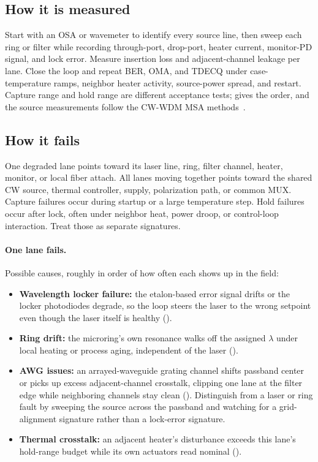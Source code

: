 \subsection{How it is measured}
\label{sec:wdm-how-measured}

Start with an OSA or wavemeter to identify every source line, then sweep each ring
or filter while recording through-port, drop-port, heater current, monitor-PD
signal, and lock error. Measure insertion loss and adjacent-channel leakage per
lane. Close the loop and repeat BER, OMA, and TDECQ under case-temperature ramps,
neighbor heater activity, source-power spread, and restart. Capture range and hold
range are different acceptance tests;  gives the order,
and the source measurements follow the CW-WDM MSA methods~\cite{cwwdm}.

\subsection{How it fails}
\label{sec:wdm-how-fails}

One degraded lane points toward its laser line, ring, filter channel, heater,
monitor, or local fiber attach. All lanes moving together points toward the shared
CW source, thermal controller, supply, polarization path, or common MUX. Capture
failures occur during startup or a large temperature step. Hold failures occur
after lock, often under neighbor heat, power droop, or control-loop interaction.
Treat those as separate signatures.

\paragraph{One lane fails.}
Possible causes, roughly in order of how often each shows up in the field:

\begin{itemize}
\item \textbf{Wavelength locker failure:} the etalon-based error signal drifts or
      the locker photodiodes degrade, so the loop steers the laser to the wrong
      setpoint even though the laser itself is healthy ().
\item \textbf{Ring drift:} the microring's own resonance walks off the assigned
      $\lambda$ under local heating or process aging, independent of the laser
      ().
\item \textbf{AWG issues:} an arrayed-waveguide grating channel shifts passband
      center or picks up excess adjacent-channel crosstalk, clipping one lane at
      the filter edge while neighboring channels stay clean
      (). Distinguish from a laser or ring
      fault by sweeping the source across the passband and watching for a
      grid-alignment signature rather than a lock-error signature.
\item \textbf{Thermal crosstalk:} an adjacent heater's disturbance exceeds this
      lane's hold-range budget while its own actuators read nominal
      ().
\end{itemize}

